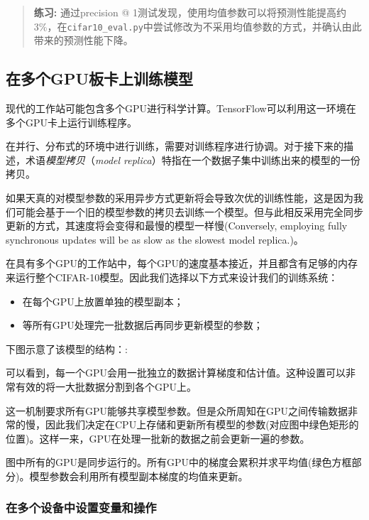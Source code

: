 \begin{quote}
\textbf{练习:} 通过precision @
1测试发现，使用均值参数可以将预测性能提高约3\%，在\texttt{cifar10\_eval.py}中尝试修改为不采用均值参数的方式，并确认由此带来的预测性能下降。
\end{quote}

\subsection{在多个GPU板卡上训练模型
}\label{ux5728ux591aux4e2agpuux677fux5361ux4e0aux8badux7ec3ux6a21ux578b}

现代的工作站可能包含多个GPU进行科学计算。TensorFlow可以利用这一环境在多个GPU卡上运行训练程序。

在并行、分布式的环境中进行训练，需要对训练程序进行协调。对于接下来的描述，术语\emph{模型拷贝}（\emph{model
replica}）特指在一个数据子集中训练出来的模型的一份拷贝。

如果天真的对模型参数的采用异步方式更新将会导致次优的训练性能，这是因为我们可能会基于一个旧的模型参数的拷贝去训练一个模型。但与此相反采用完全同步更新的方式，其速度将会变得和最慢的模型一样慢(Conversely,
employing fully synchronous updates will be as slow as the slowest model
replica.)。

在具有多个GPU的工作站中，每个GPU的速度基本接近，并且都含有足够的内存来运行整个CIFAR-10模型。因此我们选择以下方式来设计我们的训练系统：

\begin{itemize}
\item
  在每个GPU上放置单独的模型副本；
\item
  等所有GPU处理完一批数据后再同步更新模型的参数；
\end{itemize}

下图示意了该模型的结构：:

可以看到，每一个GPU会用一批独立的数据计算梯度和估计值。这种设置可以非常有效的将一大批数据分割到各个GPU上。

这一机制要求所有GPU能够共享模型参数。但是众所周知在GPU之间传输数据非常的慢，因此我们决定在CPU上存储和更新所有模型的参数(对应图中绿色矩形的位置)。这样一来，GPU在处理一批新的数据之前会更新一遍的参数。

图中所有的GPU是同步运行的。所有GPU中的梯度会累积并求平均值(绿色方框部分)。模型参数会利用所有模型副本梯度的均值来更新。

\subsubsection{在多个设备中设置变量和操作}\label{ux5728ux591aux4e2aux8bbeux5907ux4e2dux8bbeux7f6eux53d8ux91cfux548cux64cdux4f5c}


